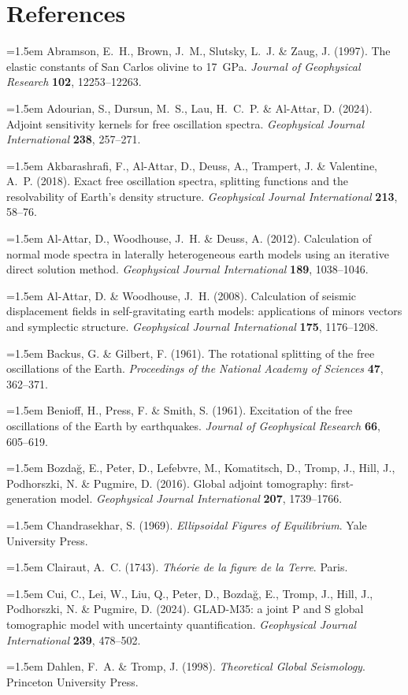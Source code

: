 \documentclass[a4paper,12pt]{paper}
\begin{document}
\section*{References}
\begingroup
\setlength{\parindent}{0pt}\setlength{\parskip}{4pt plus 1pt}
\newcommand{\refitem}[1]{\par\hangindent=1.5em #1}
\refitem{Abramson, E.~H., Brown, J.~M., Slutsky, L.~J. \& Zaug, J. (1997). The elastic constants of San Carlos olivine to 17~GPa. \emph{Journal of Geophysical Research} \textbf{102}, 12253--12263.}
\refitem{Adourian, S., Dursun, M.~S., Lau, H.~C.~P. \& Al-Attar, D. (2024). Adjoint sensitivity kernels for free oscillation spectra. \emph{Geophysical Journal International} \textbf{238}, 257--271.}
\refitem{Akbarashrafi, F., Al-Attar, D., Deuss, A., Trampert, J. \& Valentine, A.~P. (2018). Exact free oscillation spectra, splitting functions and the resolvability of Earth's density structure. \emph{Geophysical Journal International} \textbf{213}, 58--76.}
\refitem{Al-Attar, D., Woodhouse, J.~H. \& Deuss, A. (2012). Calculation of normal mode spectra in laterally heterogeneous earth models using an iterative direct solution method. \emph{Geophysical Journal International} \textbf{189}, 1038--1046.}
\refitem{Al-Attar, D. \& Woodhouse, J.~H. (2008). Calculation of seismic displacement fields in self-gravitating earth models: applications of minors vectors and symplectic structure. \emph{Geophysical Journal International} \textbf{175}, 1176--1208.}
\refitem{Backus, G. \& Gilbert, F. (1961). The rotational splitting of the free oscillations of the Earth. \emph{Proceedings of the National Academy of Sciences} \textbf{47}, 362--371.}
\refitem{Benioff, H., Press, F. \& Smith, S. (1961). Excitation of the free oscillations of the Earth by earthquakes. \emph{Journal of Geophysical Research} \textbf{66}, 605--619.}
\refitem{Bozda\u{g}, E., Peter, D., Lefebvre, M., Komatitsch, D., Tromp, J., Hill, J., Podhorszki, N. \& Pugmire, D. (2016). Global adjoint tomography: first-generation model. \emph{Geophysical Journal International} \textbf{207}, 1739--1766.}
\refitem{Chandrasekhar, S. (1969). \emph{Ellipsoidal Figures of Equilibrium}. Yale University Press.}
\refitem{Clairaut, A.~C. (1743). \emph{Th\'{e}orie de la figure de la Terre}. Paris.}
\refitem{Cui, C., Lei, W., Liu, Q., Peter, D., Bozda\u{g}, E., Tromp, J., Hill, J., Podhorszki, N. \& Pugmire, D. (2024). GLAD-M35: a joint P and S global tomographic model with uncertainty quantification. \emph{Geophysical Journal International} \textbf{239}, 478--502.}
\refitem{Dahlen, F.~A. \& Tromp, J. (1998). \emph{Theoretical Global Seismology}. Princeton University Press.}
\end{document}

